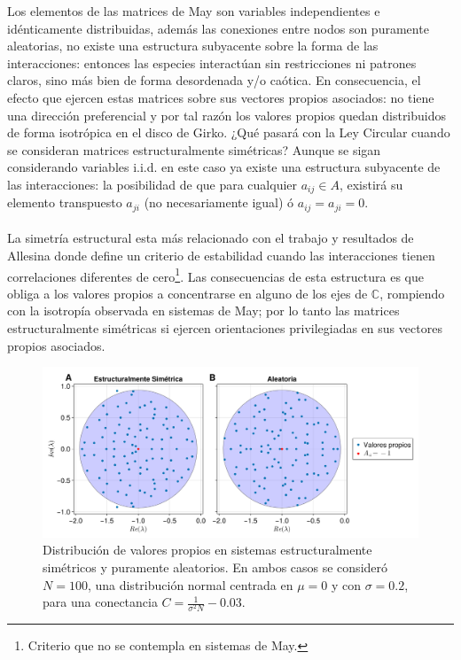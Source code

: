 Los elementos de las matrices de May son variables independientes e idénticamente distribuidas, además las conexiones entre nodos son puramente aleatorias, no existe una estructura subyacente sobre la forma de las interacciones: entonces las especies interactúan sin restricciones ni patrones claros, sino más bien de forma desordenada y/o caótica. En consecuencia, el efecto que ejercen estas matrices sobre sus vectores propios asociados: no tiene una dirección preferencial y por tal razón los valores propios quedan distribuidos de forma isotrópica en el disco de Girko. ¿Qué pasará con la Ley Circular cuando se consideran matrices estructuralmente simétricas? Aunque se sigan considerando variables i.i.d. en este caso ya existe una estructura subyacente de las interacciones: la posibilidad de que para cualquier $a_{ij}\in A$, existirá su elemento transpuesto $a_{ji}$ (no necesariamente igual) ó $a_{ij}=a_{ji}=0$.
\\
\\
La simetría estructural esta más relacionado con el trabajo y resultados de Allesina \cite{allesina2012stability} donde define un criterio de estabilidad cuando las interacciones tienen correlaciones diferentes de cero\footnote{Criterio que no se contempla en sistemas de May.}. Las consecuencias de esta estructura es que obliga a los valores propios a concentrarse en alguno de los ejes de $\mathbb{C}$, rompiendo con la isotropía observada en sistemas de May; por lo tanto las matrices estructuralmente simétricas si ejercen orientaciones privilegiadas en sus vectores propios asociados. 
\begin{figure}[h!]
	\centering
	\includegraphics[scale=0.2]{../Imagenes/LeyCircularMay}
	\caption{Distribución de valores propios en sistemas estructuralmente simétricos y puramente aleatorios. En ambos casos se consideró $N=100$, una distribución normal centrada en $\mu=0$ y con $\sigma=0.2$, para una conectancia $C=\frac{1}{\sigma^2 N}-0.03$.}
	\label{fig:LeyCircularMay}
\end{figure}

